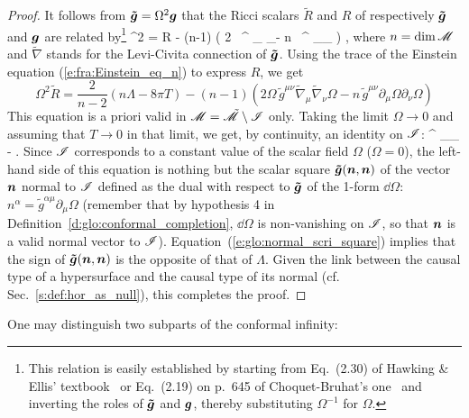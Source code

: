 \begin{proof}
It follows from $\bm{\tilde{g}} = \Omega^2 \bm{g}$ that the Ricci scalars $\tilde{R}$
and $R$ of respectively $\bm{\tilde{g}}$ and $\bm{g}$ are related by\footnote{This relation is
easily established by starting from Eq.~(2.30) of Hawking \& Ellis' textbook~\cite{HawkiE73} or Eq.~(2.19) on p.~645 of Choquet-Bruhat's one~\cite{Choqu09} and inverting the roles of $\bm{\tilde{g}}$ and $\bm{g}$, thereby substituting
$\Omega^{-1}$ for $\Omega$.}
\be \label{e:glo:tildeR_R}
    \Omega^2  = R - (n-1) \left( 2 \Omega \, ^{\mu\nu} \tilde{\nabla}_\mu
    \tilde{\nabla}_\nu \Omega - n \, ^{\mu\nu} \partial_\mu \Omega \partial_\nu \Omega
    \right) ,
\ee
where $n = \mathrm{dim}\, \mathscr{M}$ and $\tilde{\nabla}$ stands for the Levi-Civita connection of
$\bm{\tilde{g}}$. Using the trace of the Einstein equation (\ref{e:fra:Einstein_eq_n}) to
express $R$, we get
\[
    \Omega^2 \tilde{R} = \frac{2}{n-2}\left( n \Lambda - 8\pi T \right)
     - (n-1) \left( 2 \Omega \, \tilde{g}^{\mu\nu} \tilde{\nabla}_\mu
    \tilde{\nabla}_\nu \Omega - n \, \tilde{g}^{\mu\nu} \partial_\mu \Omega \partial_\nu \Omega
    \right)
\]
This equation is a priori valid in $\mathscr{M} = \tilde{\mathscr{M}}\setminus\mathscr{I}$ only.
Taking the limit $\Omega\rightarrow 0$ and
assuming that $T\rightarrow 0$ in that limit, we get, by continuity, an identity
on $\mathscr{I}$:
\be \label{e:glo:normal_scri_square}
^{\mu\nu} \partial_\mu \Omega \partial_\nu \Omega \stackrel{\scri}{=}
    -  \Lambda .
\ee
Since $\mathscr{I}$ corresponds to a constant value of the scalar field $\Omega$ ($\Omega=0$),
the left-hand side of this equation is nothing but the scalar square
$\bm{\tilde{g}}(\bm{n},\bm{n})$ of the vector $\bm{n}$ normal to $\mathscr{I}$
defined as the dual with respect to $\bm{\tilde{g}}$ of the 1-form
$\dd\Omega$: $n^\alpha = \tilde{g}^{\alpha\mu} \partial_\mu \Omega$
(remember that by hypothesis 4 in Definition~\ref{d:glo:conformal_completion}, $\dd\Omega$ is non-vanishing on $\mathscr{I}$, so that
$\bm{n}$  is a valid normal
vector to $\mathscr{I}$). Equation~(\ref{e:glo:normal_scri_square}) implies
that the sign of $\bm{\tilde{g}}(\bm{n},\bm{n})$ is the opposite of that of $\Lambda$.
Given the link between the causal type of a hypersurface and the causal type of its normal
(cf. Sec.~\ref{s:def:hor_as_null}), this completes the proof.
\end{proof}

One may distinguish two subparts of the conformal infinity:

